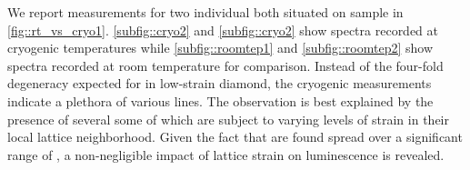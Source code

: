 			We report measurements for two individual \nds both situated on sample \insituSo in \autoref{fig::rt_vs_cryo1}. \autoref{subfig::cryo2} and \autoref{subfig::cryo2} show spectra recorded at cryogenic temperatures while \autoref{subfig::roomtep1} and \autoref{subfig::roomtep2} show spectra recorded at room temperature for comparison. Instead of the four-fold degeneracy expected for \sivs in low-strain diamond, the cryogenic measurements indicate a plethora of various lines. The observation is best explained by the presence of several \sivs some of which are subject to varying levels of strain in their local lattice neighborhood. Given the fact that \zpls are found spread over a significant range of \wls, a non-negligible impact of lattice strain on \siv luminescence is revealed.

			